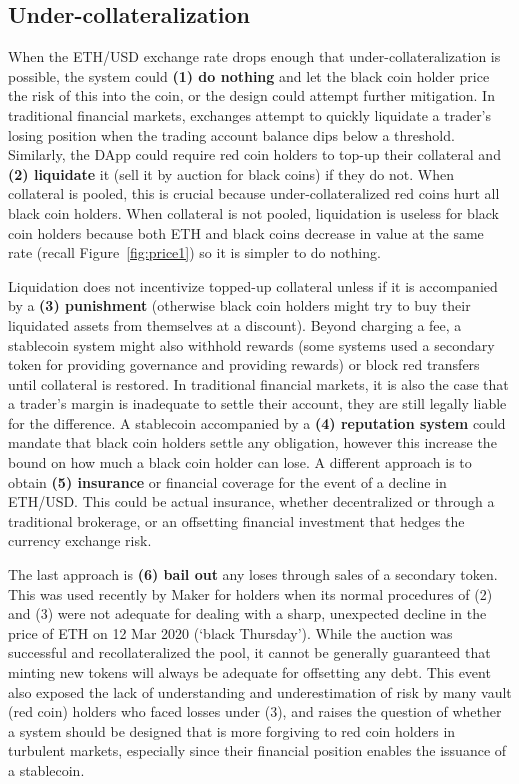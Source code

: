 

\subsection{Under-collateralization}

When the ETH/USD exchange rate drops enough that under-collateralization is possible, the system could \textbf{(1) do nothing} and let the black coin holder price the risk of this into the coin, or the design could attempt further mitigation. In traditional financial markets, exchanges attempt to quickly liquidate a trader's losing position when the trading account balance dips below a threshold. Similarly, the DApp could require red coin holders to top-up their collateral and \textbf{(2) liquidate} it (\eg sell it by auction for black coins) if they do not. When collateral is pooled, this is crucial because under-collateralized red coins hurt all black coin holders. When collateral is not pooled, liquidation is useless for black coin holders because both ETH and black coins decrease in value at the same rate (recall Figure~\ref{fig:price1}) so it is simpler to do nothing.

Liquidation does not incentivize topped-up collateral unless if it is accompanied by a \textbf{(3) punishment} (otherwise black coin holders might try to buy their liquidated assets from themselves at a discount). Beyond charging a fee, a stablecoin system might also withhold rewards (some systems used a secondary token for providing governance and providing rewards) or block red transfers until collateral is restored. In traditional financial markets, it is also the case that a trader's margin is inadequate to settle their account, they are still legally liable for the difference. A stablecoin accompanied by a \textbf{(4) reputation system} could mandate that black coin holders settle any obligation, however this increase the bound on how much a black coin holder can lose. A different approach is to obtain \textbf{(5) insurance} or financial coverage for the event of a decline in ETH/USD. This could be actual insurance, whether decentralized or through a traditional brokerage, or an offsetting financial investment that hedges the currency exchange risk.


The last approach is \textbf{(6) bail out} any loses through sales of a secondary token. This was used recently by Maker for \dai holders when its normal procedures of (2) and (3) were not adequate for dealing with a sharp, unexpected decline in the price of ETH on 12 Mar 2020 (`black Thursday'). While the auction was successful and recollateralized the pool, it cannot be generally guaranteed that minting new tokens will always be adequate for offsetting any debt. This event also exposed the lack of understanding and underestimation of risk by many vault (\ie red coin) holders who faced losses under (3), and raises the question of whether a system should be designed that is more forgiving to red coin holders in turbulent markets, especially since their financial position enables the issuance of a stablecoin. 


